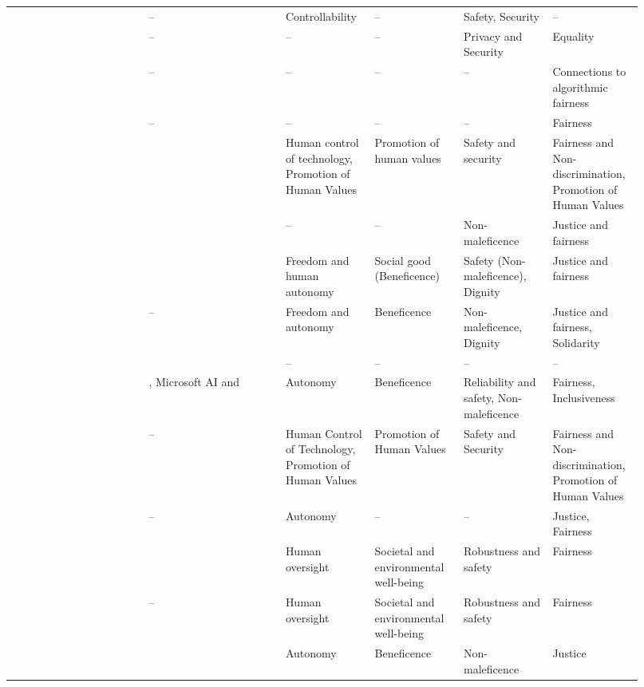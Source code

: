 \begin{landscape}
\begin{ThreePartTable}
\begin{longtable}{P{0.2\linewidth}P{0.2\linewidth}P{0.13\linewidth}P{0.13\linewidth}P{0.13\linewidth}P{0.13\linewidth}}
        \textcite{Gianni_2022} & -- & Controllability & -- & Safety, Security & -- \\ 
        \textcite{Gupta_2021} & -- & -- & -- & Privacy and Security & Equality \\ 
        \textcite{Hacker_2022} & -- & -- & -- & -- & Connections to \mbox{algorithmic} fairness \\ 
        \textcite{Hagendorff_2020} & -- & -- & -- & -- & Fairness \\ 
        \textcite{Havrda_2020} & \textcite{Fjeld_2020} & Human control of \mbox{technology}, \mbox{Promotion} of Human Values & Promotion of human values & Safety and security & Fairness and \mbox{Non-discrimination}, Promotion of Human Values \\ 
        \textcite{Henriksen_2021} & \textcite{Jobin_2019} & -- & -- & Non-maleficence & Justice and fairness \\ 
        \textcite{Jakesch_2022} & \textcite{Jobin_2019} & Freedom and human autonomy & Social good (\mbox{Beneficence})\tnote{*} & Safety (Non-maleficence)\tnote{*}, Dignity & Justice and fairness \\ 
        \textcite{Jobin_2019} & -- & Freedom and autonomy & Beneficence & Non-maleficence, \mbox{Dignity} & Justice and fairness, Solidarity \\ 
        \textcite{Kumar_2021} & \textcite{Dignum_2017} & -- & -- & -- & -- \\ 
        \textcite{Liu_2021} & \textcite{Clarke_2019}, Microsoft AI and \textcite{Floridi_2018} & Autonomy & Beneficence & Reliability and safety, Non-maleficence & Fairness, Inclusiveness \\ 
        \textcite{Lu_2022} & -- & Human Control of Technology, Promotion of Human Values & Promotion of Human Values & Safety and Security & Fairness and Non-discrimination, \mbox{Promotion} of Human Values \\ 
        \textcite{Lukkien_2021} & -- & Autonomy & -- & -- & Justice, Fairness \\ 
        \textcite{Merhi_2022} & \textcite{Mikalef_2022} & Human oversight & Societal and environmental well-being & Robustness and safety & Fairness \\ 
        \textcite{Mikalef_2022} & -- & Human oversight & Societal and environmental well-being & Robustness and safety & Fairness \\ 
        \textcite{Morley_2020} & \textcite{Floridi_2018} & Autonomy & Beneficence & Non-maleficence & Justice \\ 

\end{longtable}
\end{ThreePartTable}
\end{landscape}
